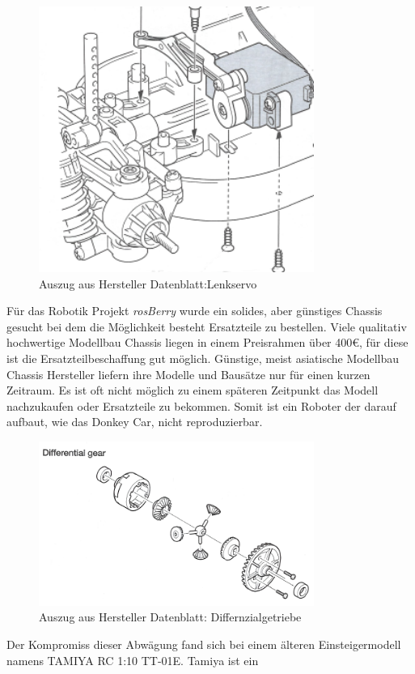 \documentclass[conference]{IEEEtran}
\begin{document}
	\begin{figure} [!h]
		\centering
		\includegraphics[width=9cm]{img/servo.png}
		\caption{Auszug aus Hersteller Datenblatt:Lenkservo }
		\label{Servomotor}
	\end{figure}
	Für das Robotik Projekt \textit{rosBerry} wurde ein solides, aber günstiges Chassis gesucht bei dem die Möglichkeit besteht Ersatzteile zu bestellen. Viele qualitativ hochwertige Modellbau Chassis liegen in einem Preisrahmen über 400€, für diese ist die Ersatzteilbeschaffung gut möglich. Günstige, meist asiatische Modellbau Chassis Hersteller liefern ihre Modelle und Bausätze nur für einen kurzen Zeitraum. Es ist oft nicht möglich zu einem späteren Zeitpunkt das Modell nachzukaufen oder Ersatzteile zu bekommen. Somit ist ein Roboter der darauf aufbaut, wie das Donkey Car, nicht reproduzierbar. 
	\\
	\begin{figure} %
		\centering
		\includegraphics[width=9cm]{img/geer.png}
		\caption{Auszug aus Hersteller Datenblatt: Differnzialgetriebe }
		\label{Getriebe}
	\end{figure}
	Der Kompromiss dieser Abwägung fand sich bei einem älteren 
	Einsteigermodell namens TAMIYA RC 1:10 TT-01E. Tamiya ist ein 
\end{document}
